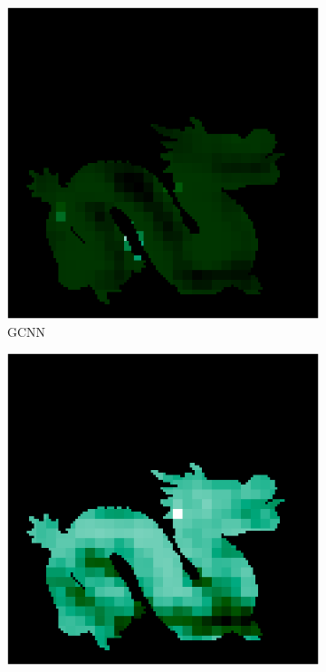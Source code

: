 \begin{figure}[H]
\begin{minipage}{0.32\linewidth}
				\begin{subfigure}[t]{0.45\linewidth}
					\includegraphics[width=\linewidth]{./Figures/feature_map_gcnn/feature_map_gcnn-gcnn_24.png}
					\caption{GCNN}
				\end{subfigure}
					\begin{subfigure}[t]{0.45\linewidth}
				\includegraphics[width=\linewidth]{./Figures/feature_map_gcnn/feature_map_gcnn-gcnn_75.png}
				\end{subfigure}
			

\end{minipage}
\end{figure}
